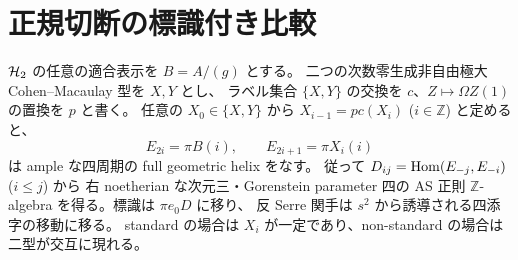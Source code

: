 \section{正規切断の標識付き比較}
\label{sec:normal-comparison}

\begin{theorem}
\label{thm:normal-helix}
$\mathcal H_2$ の任意の適合表示を $B=A/(g)$ とする。
二つの次数零生成非自由極大 Cohen--Macaulay 型を $X,Y$ とし、
ラベル集合 $\{X,Y\}$ の交換を $c$、$Z\mapsto\Omega Z(1)$ の置換を $p$ と書く。
任意の $X_0\in\{X,Y\}$ から $X_{i-1}=pc(X_i)$ ($i\in\mathbb Z$) と定めると、
\begin{equation}
 E_{2i}=\pi B(i),\qquad E_{2i+1}=\pi X_i(i)
\end{equation}
は ample な四周期の full geometric helix をなす。
従って $D_{ij}=\operatorname{Hom}(E_{-j},E_{-i})$ ($i\le j$) から
右 noetherian な次元三・Gorenstein parameter 四の AS 正則
$\mathbb Z$-algebra を得る。標識は $\pi e_0D$ に移り、
反 Serre 関手は $s^2$ から誘導される四添字の移動に移る。
standard の場合は $X_i$ が一定であり、non-standard の場合は二型が交互に現れる。
\end{theorem}

